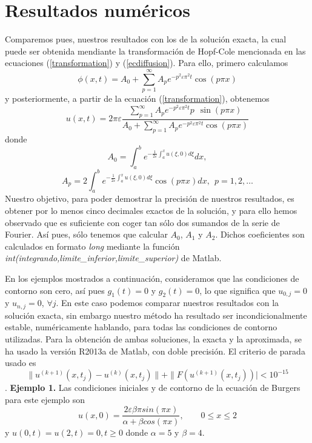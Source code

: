 \section{Resultados numéricos}
Comparemos pues, nuestros resultados con los de la solución exacta, la cual puede ser obtenida mendiante la transformación de Hopf-Cole mencionada en las ecuaciones 	(\ref{transformation}) y (\ref{ecdiffusion}). Para ello, primero calculamos
\[
\phi(x,t)=A_0+\sum\limits_{p=1}^\infty
A_pe^{-p^2\varepsilon\pi^2t}\cos{(p\pi x)}
\]
y posteriormente, a partir de la ecuación (\ref{transformation}), obtenemos
\begin{equation}\label{uanalitica}
u(x,t)=2\pi\varepsilon\frac{\sum_{p=1}^\infty
	A_pe^{-p^2\varepsilon\pi^2t} p\ \ \sin{(p\pi
		x)}}{A_0+\sum_{p=1}^\infty A_pe^{-p^2\varepsilon\pi^2t}\cos{(p\pi
		x)}}
\end{equation}
donde
\[
A_0=\int_{a}^{b} e^{-\frac{1}{2\varepsilon}\int_{a}^{x} u(\xi,0)d\xi} dx,
\]
\[
A_p=2\int_{a}^{b} e^{-\frac{1}{2\varepsilon}\int_{a}^{x}
	u(\xi,0)d\xi} \cos{(p\pi x)}dx, \ \ p=1,2,\ldots
\]
Nuestro objetivo, para poder demostrar la precisión de nuestros resultados, es obtener por lo menos cinco decimales exactos de la solución, y para ello hemos observado que es suficiente con coger tan sólo dos sumandos de la serie de Fourier. Así pues, sólo tenemos que calcular $A_0$, $A_1$ y $A_2$. Dichos coeficientes son calculados en formato \textit{long} mediante la función \textit{int(integrando,limite\_inferior,limite\_superior)} de Matlab.

En los ejemplos mostrados a continuación, consideramos que las condiciones de contorno son cero, así pues \mbox{$g_1(t)=0$} y $g_2(t)=0$, lo que significa que $u_{0,j}=0$ y $u_{n,j}=0$, $\forall j$. En este caso podemos comparar nuestros resultados con la solución exacta, sin embargo nuestro método ha resultado ser incondicionalmente estable, numéricamente hablando, para todas las condiciones de contorno utilizadas. Para la obtención de ambas soluciones, la exacta y la aproximada, se ha usado la versión R2013a de Matlab, con doble precisión. El criterio de parada usado es
$$\|u^{(k+1)}(x,t_j)-u^{(k)}(x,t_j)\|+\|F(u^{(k+1)}(x,t_j))|<10^{-15}$$.
\textbf{Ejemplo 1.} Las condiciones iniciales y de contorno de la ecuación de Burgers para este ejemplo son
\[
u(x,0)=\frac{2\varepsilon \beta \pi sin(\pi x)}{\alpha+\beta cos(\pi x)}, \qquad 0\le x\le 2
\]
y $u(0,t)=u(2,t)=0, t\ge 0$ donde $\alpha=5$ y $\beta=4$.
\vspace{0.25 cm}

